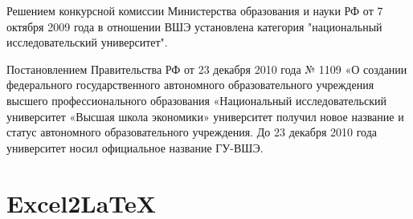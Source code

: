 \documentclass[a4paper,12pt]{article}
\begin{document}
Решением конкурсной комиссии Министерства образования и науки РФ от 7 октября 2009 года в отношении ВШЭ установлена категория "национальный исследовательский университет". 

Постановлением Правительства РФ от 23 декабря 2010 года № 1109 «О создании федерального государственного автономного образовательного учреждения высшего профессионального образования «Национальный исследовательский университет «Высшая школа экономики» университет получил новое название и статус автономного образовательного учреждения. До 23 декабря 2010 года университет носил официальное название ГУ-ВШЭ.



\section{Excel2\LaTeX}
\end{document}
